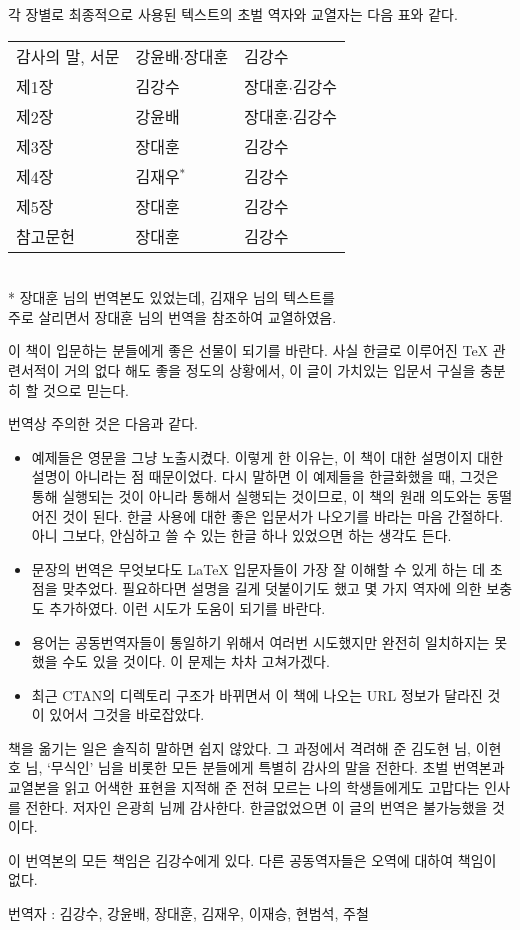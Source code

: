 각 장별로 최종적으로 사용된 텍스트의 초벌 역자와 교열자는 다음 표와 같다.
\begin{table}[!htbp]
\centering%
\begin{tabular}{lll}\hline
감사의 말, 서문 & 강윤배$\cdot$장대훈 & 김강수 \\
제1장 & 김강수 & 장대훈$\cdot$김강수 \\
제2장 & 강윤배 & 장대훈$\cdot$김강수 \\
제3장 & 장대훈 & 김강수 \\
제4장 & 김재우$^*$ & 김강수 \\
제5장 & 장대훈 & 김강수 \\
참고문헌 & 장대훈 & 김강수\\ \hline
\end{tabular}\ \\
\footnotesize{*
장대훈 님의 번역본도 있었는데, 김재우 님의 텍스트를\\
주로 살리면서 장대훈 님의 번역을 참조하여 교열하였음.}
\end{table}

이 책이  입문하는 분들에게 좋은 선물이 되기를 바란다.
사실 한글로 이루어진 \TeX{} 관련서적이 거의 없다 해도 좋을 정도의 상황에서, 이 글이 가치있는 입문서 구실을 충분히 할 것으로 믿는다.

\bigskip

번역상 주의한 것은 다음과 같다.
\begin{itemize}
\item 예제들은 영문을 그냥 노출시켰다. 이렇게 한 이유는, 이 책이  대한 설명이지  대한 설명이 아니라는 점 때문이었다. 다시 말하면 이 예제들을 한글화했을 때, 그것은  통해 실행되는
것이 아니라  통해서 실행되는 것이므로, 이 책의 원래 의도와는
동떨어진 것이 된다.  한글 사용에 대한 좋은 입문서가 나오기를 바라는 마음 간절하다. 아니 그보다, 안심하고 쓸 수 있는 한글  하나 있었으면 하는 생각도 든다.
\item 문장의 번역은 무엇보다도 \LaTeX{} 입문자들이 가장 잘 이해할 수 있게 하는 데 초점을 맞추었다. 필요하다면 설명을 길게 덧붙이기도 했고 몇 가지 역자에 의한 보충도 추가하였다. 이런 시도가 도움이 되기를 바란다.
\item 용어는 공동번역자들이 통일하기 위해서 여러번 시도했지만 완전히
일치하지는 못했을 수도 있을 것이다. 이 문제는 차차 고쳐가겠다.
\item 최근 CTAN의 디렉토리 구조가 바뀌면서 이 책에 나오는 URL 정보가
달라진 것이 있어서 그것을 바로잡았다.
\end{itemize}

책을 옮기는 일은 솔직히 말하면 쉽지 않았다. 그 과정에서 격려해 준 김도현 님, 이현호 님, `무식인' 님을 비롯한 모든 분들에게 특별히 감사의 말을 전한다.
초벌 번역본과 교열본을 읽고 어색한 표현을 지적해 준  전혀 모르는 나의 학생들에게도 고맙다는 인사를 전한다.
 저자인 은광희 님께 감사한다. 한글 없었으면 이 글의 번역은 불가능했을 것이다.

이 번역본의 모든 책임은 김강수에게 있다. 다른 공동역자들은 오역에 대하여 책임이 없다.

\bigskip
번역자 : 김강수, 강윤배, 
장대훈, 김재우,
이재승, 현범석, 주철

\endinput
